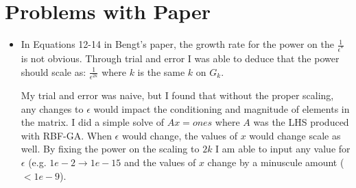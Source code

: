 \documentclass[11pt]{report}
\begin{document}
\section{Problems with Paper}
\begin{itemize}


\item In Equations 12-14 in Bengt's paper, the growth rate for the power on the $\frac{1}{\epsilon^{*}}$ is not obvious. Through trial and error I was able to deduce that the power should scale as: $\frac{1}{\epsilon^{2k}}$ where $k$ is the same $k$ on $G_k$. 

My trial and error was naive, but I found that without the proper scaling, any changes to $\epsilon$ would impact the conditioning and magnitude of elements in the matrix. I did a simple solve of $A x = ones$ where $A$ was the LHS produced with RBF-GA. When $\epsilon$ would change, the values of $x$ would change scale as well. By fixing the power on the scaling to $2k$ I am able to input any value for $\epsilon$ (e.g. $1e-2 \rightarrow 1e-15$ and the values of $x$ change by a minuscule amount ($< 1e-9$).


\end{itemize}
\end{document}
